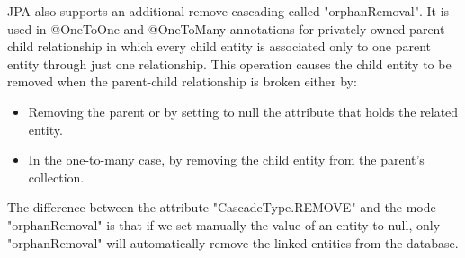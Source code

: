 JPA also supports an additional remove cascading called "orphanRemoval". It is used in @OneToOne and @OneToMany annotations for privately 
owned parent-child relationship in which every child entity is associated only to one parent entity through just one relationship. This operation 
causes the child entity to be removed when the parent-child relationship is broken either by: 
\begin{itemize}
    \item Removing the parent or by setting to null the attribute that holds the related entity. 
    \item In the one-to-many case, by removing the child entity from the parent's collection.
\end{itemize}
The difference between the attribute "CascadeType.REMOVE" and the mode "orphanRemoval" is that if we set manually the value of an entity to null, 
only "orphanRemoval" will automatically remove the linked entities from the database. 